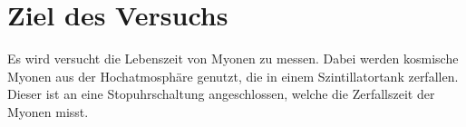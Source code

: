 \section{Ziel des Versuchs}
\label{sec:ziel}
Es wird versucht die Lebenszeit von Myonen zu messen. Dabei werden kosmische Myonen aus der Hochatmosphäre genutzt, die in einem Szintillatortank zerfallen.
Dieser ist an eine Stopuhrschaltung angeschlossen, welche die Zerfallszeit der Myonen misst.